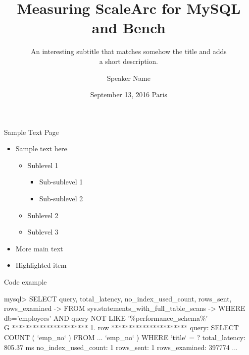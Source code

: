 \documentclass[aspectratio=169]{beamer}
\title[Percona Common Template v.2016]{Measuring ScaleArc for MySQL and Bench}
\subtitle{An interesting subtitle that matches somehow the title and adds\\a short description.}
\author{Speaker Name}
\date{September 13, 2016 Paris}
\begin{document}
        \begin{frame}
                \titlepage
        \end{frame}



        \begin{frame}{Sample Text Page}
                \begin{itemize}
                        \item Sample text here
                        \begin{itemize}
                                \item Sublevel 1
                                \begin{itemize}
                                	\item Sub-sublevel 1
                                	\item Sub-sublevel 2
                                \end{itemize}
                                \item Sublevel 2
                                \item Sublevel 3
                        \end{itemize}
                        \item More main text
                        \item \alert{Highlighted item}
                \end{itemize}
        \end{frame}
		
		\begin{frame}[fragile]{Code example}
			\begin{semiverbatim}
				mysql> SELECT query, total_latency, no_index_used_count, rows_sent, rows_examined
				    -> FROM sys.statements_with_full_table_scans 
				    -> WHERE db='employees' AND query NOT LIKE '\%performance_schema\%'\\G
				********************** 1. row **********************
				              query: SELECT COUNT ( `emp_no` ) FROM ...  `emp_no` ) WHERE `title` = ?
				      total_latency: 805.37 ms
				no_index_used_count: 1
				          rows_sent: 1
				      rows_examined: 397774
				...
			\end{semiverbatim}
		\end{frame}
		
\end{document}
